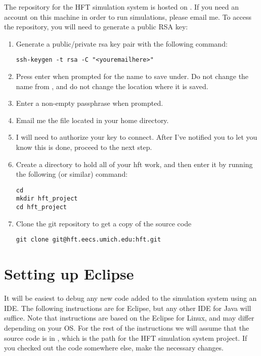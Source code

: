 \documentclass[11pt]{article}
\begin{document}
The repository for the HFT simulation system is hosted on . If
you
need an account on this machine in order to run simulations, please email me.
To access the repository, you will need to generate a public RSA key:
\begin{enumerate}
\item Generate a public/private rsa key pair with the following command:

\begin{verbatim}
ssh-keygen -t rsa -C "<youremailhere>"
\end{verbatim}

\item Press enter when prompted for the name to save under. Do not change the
  name from , and do not change the location where it is saved.
\item Enter a non-empty passphrase when prompted.
\item Email me the  file located in your home directory.
\item I will need to authorize your key to connect. After I've notified you to
  let you know this is done, proceed to the next step.
\item Create a directory to hold all of your hft work, and then enter it by
  running the following (or similar) command:

\begin{verbatim}
cd
mkdir hft_project
cd hft_project
\end{verbatim}

\item Clone the git repository to get a copy of the source code

\begin{verbatim}
git clone git@hft.eecs.umich.edu:hft.git
\end{verbatim}

\end{enumerate}

\section{Setting up Eclipse}
It will be easiest to debug any new code added to the simulation system using an
IDE. The following instructions are for Eclipse, but any other IDE for Java will
suffice. Note that instructions are based on the Eclipse for Linux, and may
differ depending on your OS. For the rest of the instructions we will assume
that the source code is in , which is the path for the HFT simulation system project. If you checked out the code
somewhere else, make the necessary changes.
\end{document}
